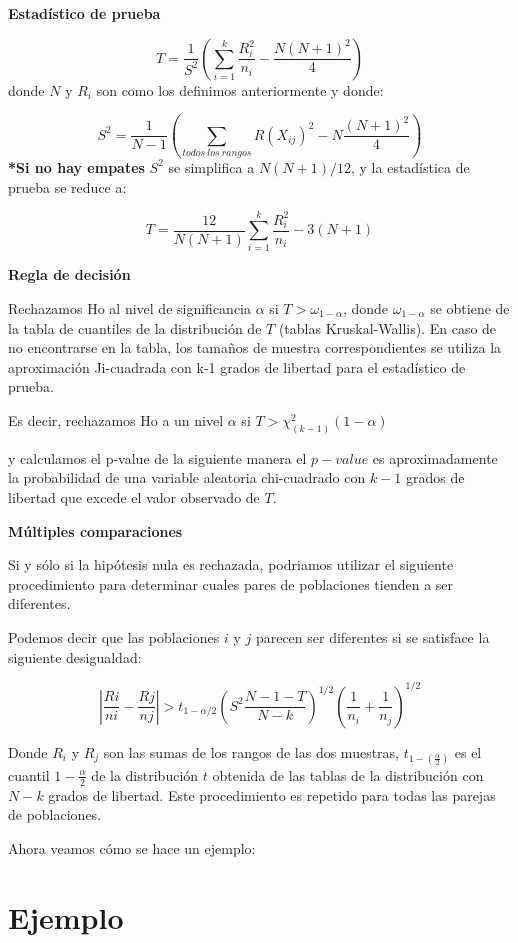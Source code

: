 \documentclass[a4paper,oneside,openany]{book}
\begin{document}
\textbf{Estadístico de prueba}

\[T= \frac{1}{S^2}\left(\sum_{i=1}^{k}\frac{R^2_{i}}{n_{i}}-\frac{N(N+1)^2}{4}\right)\]
donde \(N\) y \(R_{i}\) son como los definimos anteriormente y donde:

\[ S^2 = \frac{1}{N-1}\left(\sum_{todos\ los\ rangos}R(X_{ij})^2-N\frac{(N+1)^2}{4}\right)\]
\textbf{*Si no hay empates} \(S^2\) se simplifica a \(N(N+1)/12\), y la
estadística de prueba se reduce a:

\[ T= \frac{12}{N(N+1)}\sum_{i=1}^{k}\frac{R^2_{i}}{n_{i}}-3(N+1) \]

\textbf{Regla de decisión}

Rechazamos Ho al nivel de significancia \(\alpha\) si
\(T>\omega_{1-\alpha}\), donde \(\omega_{1-\alpha}\) se obtiene de la
tabla de cuantiles de la distribución de \(T\) (tablas Kruskal-Wallis).
En caso de no encontrarse en la tabla, los tamaños de muestra
correspondientes se utiliza la aproximación Ji-cuadrada con k-1 grados
de libertad para el estadístico de prueba.

Es decir, rechazamos Ho a un nivel \(\alpha\) si
\(T > \chi^2_{(k-1)}(1-\alpha)\)

y calculamos el p-value de la siguiente manera el \(p-value\) es
aproximadamente la probabilidad de una variable aleatoria chi-cuadrado
con \(k-1\) grados de libertad que excede el valor observado de \(T\).

\textbf{Múltiples comparaciones}

Si y sólo si la hipótesis nula es rechazada, podriamos utilizar el
siguiente procedimiento para determinar cuales pares de poblaciones
tienden a ser diferentes.

Podemos decir que las poblaciones \(i\) y \(j\) parecen ser diferentes
si se satisface la siguiente desigualdad:

\[\left|\frac{Ri}{ni}- \frac{Rj}{nj}\right|> t_{1-\alpha/2}\left(S^2\frac{N-1-T}{N-k}\right)^{1/2}\left(\frac{1}{n_i}+\frac{1}{n_j}\right)^{1/2}\]

Donde \(R_i\) y \(R_j\) son las sumas de los rangos de las dos muestras,
\(t_{1-(\frac{\alpha}{2})}\) es el cuantil \(1-\frac{\alpha}{2}\) de la
distribución \(t\) obtenida de las tablas de la distribución con \(N-k\)
grados de libertad. Este procedimiento es repetido para todas las
parejas de poblaciones.

Ahora veamos cómo se hace un ejemplo:

\section{Ejemplo}\label{ejemplo-6}
\end{document}
